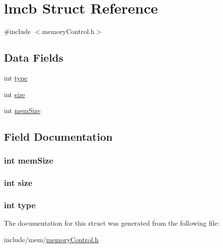 \hypertarget{structlmcb}{}\section{lmcb Struct Reference}
\label{structlmcb}


{\ttfamily \#include $<$memory\+Control.\+h$>$}

\subsection*{Data Fields}
\begin{DoxyCompactItemize}
\item 
int \hyperlink{structlmcb_ac765329451135abec74c45e1897abf26}{type}
\item 
int \hyperlink{structlmcb_a439227feff9d7f55384e8780cfc2eb82}{size}
\item 
int \hyperlink{structlmcb_af9658f4d1c59d6d251445c83931f0e55}{mem\+Size}
\end{DoxyCompactItemize}


\subsection{Field Documentation}
\subsubsection[{\texorpdfstring{mem\+Size}{memSize}}]{\setlength{\rightskip}{0pt plus 5cm}int mem\+Size}\hypertarget{structlmcb_af9658f4d1c59d6d251445c83931f0e55}{}\label{structlmcb_af9658f4d1c59d6d251445c83931f0e55}
\subsubsection[{\texorpdfstring{size}{size}}]{\setlength{\rightskip}{0pt plus 5cm}int size}\hypertarget{structlmcb_a439227feff9d7f55384e8780cfc2eb82}{}\label{structlmcb_a439227feff9d7f55384e8780cfc2eb82}
\subsubsection[{\texorpdfstring{type}{type}}]{\setlength{\rightskip}{0pt plus 5cm}int type}\hypertarget{structlmcb_ac765329451135abec74c45e1897abf26}{}\label{structlmcb_ac765329451135abec74c45e1897abf26}


The documentation for this struct was generated from the following file\+:\begin{DoxyCompactItemize}
\item 
include/mem/\hyperlink{memory_control_8h}{memory\+Control.\+h}\end{DoxyCompactItemize}
